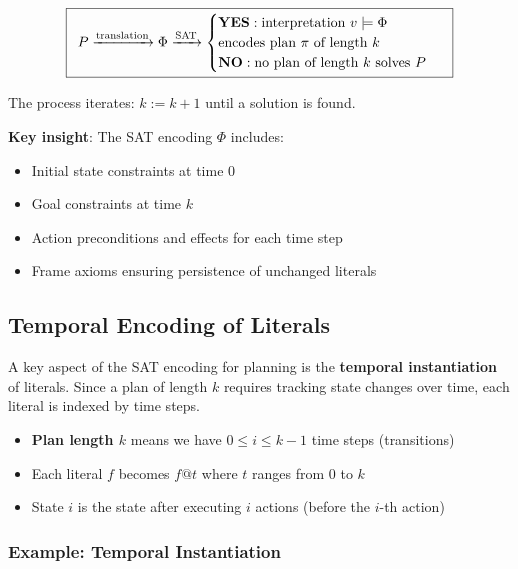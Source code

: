 \documentclass[11pt,a4paper]{article}
\theoremstyle{definition}
\theoremstyle{plain}
\theoremstyle{remark}
\begin{document}
\[
\boxed{
\begin{array}{c}
P \xrightarrow{\text{translation}} \Phi \xrightarrow{\text{SAT}} 
\begin{cases}
\text{\textbf{YES}}: \text{interpretation } v \models \Phi \\
\text{encodes plan } \pi \text{ of length } k \\
\text{\textbf{NO}}: \text{no plan of length } k \text{ solves } P
\end{cases}
\end{array}
}
\]

The process iterates: $k := k + 1$ until a solution is found.

\textbf{Key insight}: The SAT encoding $\Phi$ includes:
\begin{itemize}
    \item Initial state constraints at time 0
    \item Goal constraints at time $k$
    \item Action preconditions and effects for each time step
    \item Frame axioms ensuring persistence of unchanged literals
\end{itemize}





\subsection{Temporal Encoding of Literals}

A key aspect of the SAT encoding for planning is the \textbf{temporal instantiation} of literals. Since a plan of length $k$ requires tracking state changes over time, each literal is indexed by time steps.

\begin{itemize}
    \item \textbf{Plan length $k$} means we have $0 \leq i \leq k-1$ time steps (transitions)
    \item Each literal $f$ becomes $f@t$ where $t$ ranges from $0$ to $k$
    \item State $i$ is the state after executing $i$ actions (before the $i$-th action)
\end{itemize}

\subsubsection{Example: Temporal Instantiation}
\end{document}
